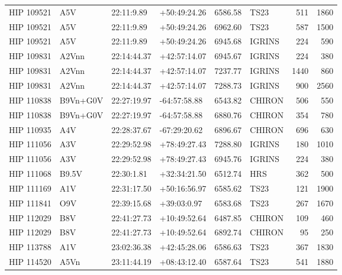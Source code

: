 \documentclass{emulateapj}
\begin{document}
\begin{longtable*}{|l|lllrlrr|}
  HIP 109521 &            A5V &     22:11:9.89 &   +50:49:24.26 &  6586.58 &       TS23 &      511 &    1860 \\
  HIP 109521 &            A5V &     22:11:9.89 &   +50:49:24.26 &  6962.60 &       TS23 &      587 &    1500 \\
  HIP 109521 &            A5V &     22:11:9.89 &   +50:49:24.26 &  6945.68 &     IGRINS &      224 &     590 \\
  HIP 109831 &          A2Vnn &    22:14:44.37 &   +42:57:14.07 &  6945.67 &     IGRINS &      224 &     380 \\
  HIP 109831 &          A2Vnn &    22:14:44.37 &   +42:57:14.07 &  7237.77 &     IGRINS &     1440 &     860 \\
  HIP 109831 &          A2Vnn &    22:14:44.37 &   +42:57:14.07 &  7288.73 &     IGRINS &      900 &    2560 \\
  HIP 110838 &       B9Vn+G0V &    22:27:19.97 &   -64:57:58.88 &  6543.82 &     CHIRON &      506 &     550 \\
  HIP 110838 &       B9Vn+G0V &    22:27:19.97 &   -64:57:58.88 &  6880.76 &     CHIRON &      354 &     780 \\
  HIP 110935 &            A4V &    22:28:37.67 &   -67:29:20.62 &  6896.67 &     CHIRON &      696 &     630 \\
  HIP 111056 &            A3V &    22:29:52.98 &   +78:49:27.43 &  7288.80 &     IGRINS &      180 &    1010 \\
  HIP 111056 &            A3V &    22:29:52.98 &   +78:49:27.43 &  6945.76 &     IGRINS &      224 &     380 \\
  HIP 111068 &          B9.5V &     22:30:1.81 &   +32:34:21.50 &  6512.74 &        HRS &      362 &     500 \\
  HIP 111169 &            A1V &    22:31:17.50 &   +50:16:56.97 &  6585.62 &       TS23 &      121 &    1900 \\
  HIP 111841 &            O9V &    22:39:15.68 &    +39:03:0.97 &  6583.68 &       TS23 &      267 &    1670 \\
  HIP 112029 &            B8V &    22:41:27.73 &   +10:49:52.64 &  6487.85 &     CHIRON &      109 &     460 \\
  HIP 112029 &            B8V &    22:41:27.73 &   +10:49:52.64 &  6892.74 &     CHIRON &       95 &     250 \\
  HIP 113788 &            A1V &    23:02:36.38 &   +42:45:28.06 &  6586.63 &       TS23 &      367 &    1830 \\
  HIP 114520 &           A5Vn &    23:11:44.19 &   +08:43:12.40 &  6587.64 &       TS23 &      541 &    1880 \\

\end{longtable*}
\end{document}
